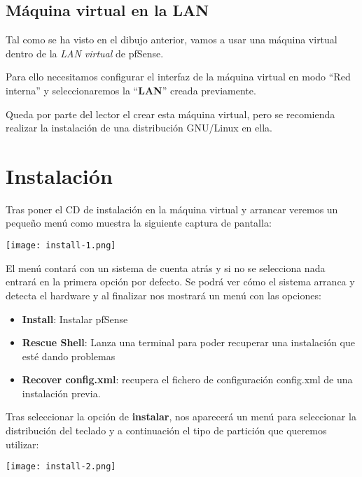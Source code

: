 \subsection{Máquina virtual en la LAN}
Tal como se ha visto en el dibujo anterior, vamos a usar una máquina virtual dentro de la \textit{LAN virtual} de pfSense.

Para ello necesitamos configurar el interfaz de la máquina virtual en modo “Red interna” y seleccionaremos la “\textbf{LAN}” creada previamente.

Queda por parte del lector el crear esta máquina virtual, pero se recomienda realizar la instalación de una distribución GNU/Linux en ella.

\section{Instalación}
Tras poner el CD de instalación en la máquina virtual y arrancar veremos un pequeño menú como muestra la siguiente captura de pantalla:

\begin{center}
    \vspace{-10pt}
    \texttt{[image: install-1.png]}
    \vspace{-20pt}
\end{center}

El menú contará con un sistema de cuenta atrás y si no se selecciona nada entrará en la primera opción por defecto. Se podrá ver cómo el sistema arranca y detecta el  hardware y al finalizar nos mostrará un menú con las opciones:

\begin{itemize}
    \item \textbf{Install}: Instalar pfSense
    \item \textbf{Rescue Shell}: Lanza una terminal para poder recuperar una instalación que esté dando problemas
    \item \textbf{Recover config.xml}: recupera el fichero de configuración config.xml de una instalación previa.
\end{itemize}

Tras seleccionar la opción de \textbf{instalar}, nos aparecerá un menú para seleccionar la distribución del teclado y a continuación el tipo de partición que queremos utilizar:

\begin{center}
    \vspace{-10pt}
    \texttt{[image: install-2.png]}
\end{center}

